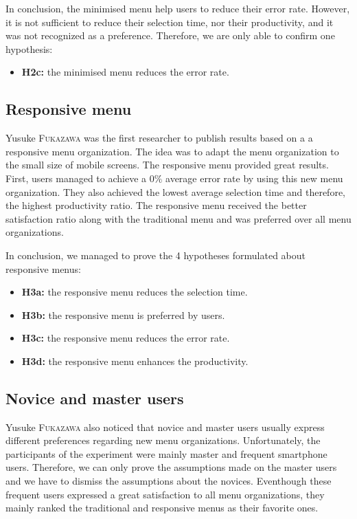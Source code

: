 In conclusion, the minimised menu help users to reduce their error rate. 
However, it is not sufficient to reduce their selection time, nor their 
productivity, and it was not recognized as a preference. Therefore, we are 
only able to confirm one hypothesis:

\begin{itemize}
 \item \textbf{H2c:} the minimised menu reduces the error rate.
\end{itemize}

\subsection{Responsive menu}
Yusuke \textsc{Fukazawa} was the first researcher to publish results based on a 
a responsive menu organization. The idea was to adapt the menu organization to 
the small size of mobile screens. The responsive menu provided great results. 
First, users managed to achieve a $0\%$ average error rate by using this new 
menu organization. They also achieved the lowest average selection time and 
therefore, the highest productivity ratio. The responsive menu received the 
better satisfaction ratio along with the traditional menu and was preferred 
over all menu organizations.\newline

In conclusion, we managed to prove the 4 hypotheses formulated about responsive 
menus:

\begin{itemize}
 \item \textbf{H3a:} the responsive menu reduces the selection time.
 \item \textbf{H3b:} the responsive menu is preferred by users.
 \item \textbf{H3c:} the responsive menu reduces the error rate.
 \item \textbf{H3d:} the responsive menu enhances the productivity.
\end{itemize}

\subsection{Novice and master users}
Yusuke \textsc{Fukazawa} also noticed that novice and master users usually 
express different preferences regarding new menu organizations. Unfortunately, 
the participants of the experiment were mainly master and frequent smartphone 
users. Therefore, we can only prove the assumptions made on the master 
users and we have to dismiss the assumptions about the novices. Eventhough 
these frequent users expressed a great satisfaction to all menu organizations, 
they mainly ranked the traditional and responsive menus as their favorite 
ones.\newline

